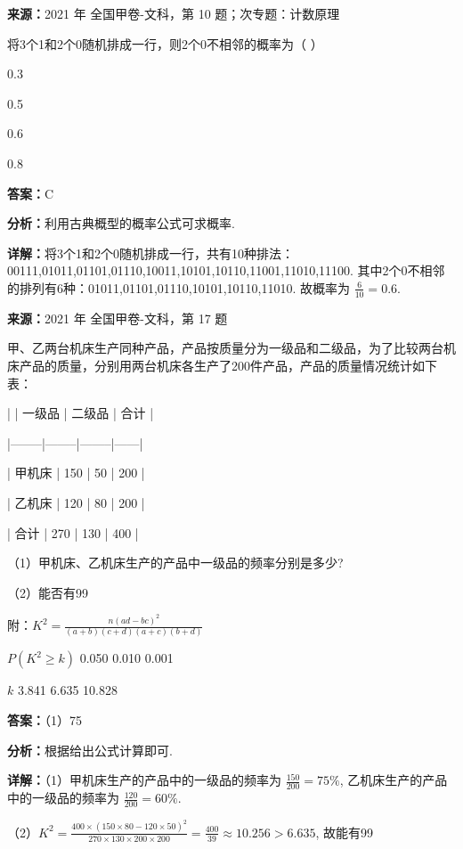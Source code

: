 \begin{question}[points=5]
\textbf{来源：}2021 年 全国甲卷-文科，第 10 题；次专题：计数原理\par
将3个1和2个0随机排成一行，则2个0不相邻的概率为（ ）
\begin{choices}
  \item 0.3
  \item 0.5
  \item 0.6
  \item 0.8
\end{choices}
\begin{solution}
\textbf{答案：}C

\textbf{分析：}利用古典概型的概率公式可求概率.

\textbf{详解：}将3个1和2个0随机排成一行，共有10种排法：00111,01011,01101,01110,10011,10101,10110,11001,11010,11100. 其中2个0不相邻的排列有6种：01011,01101,01110,10101,10110,11010. 故概率为 $\frac{6}{10}=0.6$.
\end{solution}
\end{question}

\begin{question}[points=12]
\textbf{来源：}2021 年 全国甲卷-文科，第 17 题\par
甲、乙两台机床生产同种产品，产品按质量分为一级品和二级品，为了比较两台机床产品的质量，分别用两台机床各生产了200件产品，产品的质量情况统计如下表：



|        | 一级品 | 二级品 | 合计 |

|--------|--------|--------|------|

| 甲机床 | 150    | 50     | 200  |

| 乙机床 | 120    | 80     | 200  |

| 合计   | 270    | 130    | 400  |



（1）甲机床、乙机床生产的产品中一级品的频率分别是多少?



（2）能否有99%



附：$K^2 = \frac{n(ad-bc)^2}{(a+b)(c+d)(a+c)(b+d)}$



$P(K^2 \ge k)$  0.050  0.010  0.001



$k$          3.841  6.635  10.828
\begin{solution}
\textbf{答案：}（1）75%

\textbf{分析：}根据给出公式计算即可.

\textbf{详解：}（1）甲机床生产的产品中的一级品的频率为 $\frac{150}{200}=75\%$, 乙机床生产的产品中的一级品的频率为 $\frac{120}{200}=60\%$.

（2）$K^2 = \frac{400 \times (150\times80 - 120\times50)^2}{270\times130\times200\times200} = \frac{400}{39} \approx 10.256 > 6.635$, 故能有99%
\end{solution}
\end{question}

